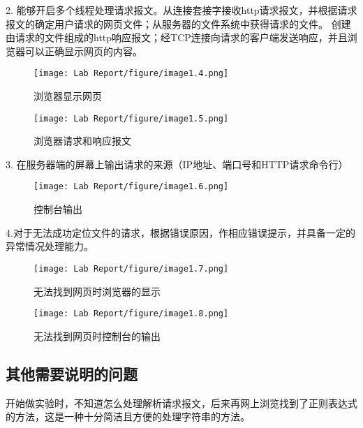 \hspace*{2em}2. 能够开启多个线程处理请求报文。从连接套接字接收http请求报文，并根据请求报文的确定用户请求的网页文件；从服务器的文件系统中获得请求的文件。 创建由请求的文件组成的http响应报文；经TCP连接向请求的客户端发送响应，并且浏览器可以正确显示网页的内容。\\
\begin{figure}[H] %
\centering %
\texttt{[image: Lab Report/figure/image1.4.png]}
\caption{浏览器显示网页} %
\end{figure}
\begin{figure}[H] %
\centering %
\texttt{[image: Lab Report/figure/image1.5.png]}
\caption{浏览器请求和响应报文} %
\end{figure}
\hspace*{2em}3. 在服务器端的屏幕上输出请求的来源（IP地址、端口号和HTTP请求命令行）\\
\begin{figure}[H] %
\centering %
\texttt{[image: Lab Report/figure/image1.6.png]}
\caption{控制台输出} %
\end{figure}
\hspace*{2em}4.对于无法成功定位文件的请求，根据错误原因，作相应错误提示，并具备一定的异常情况处理能力。\\
\begin{figure}[H] %
\centering %
\texttt{[image: Lab Report/figure/image1.7.png]}
\caption{无法找到网页时浏览器的显示} %
\end{figure}
\begin{figure}[H] %
\centering %
\texttt{[image: Lab Report/figure/image1.8.png]}
\caption{无法找到网页时控制台的输出} %
\end{figure}
\subsection{其他需要说明的问题}
\hspace*{2em}开始做实验时，不知道怎么处理解析请求报文，后来再网上浏览找到了正则表达式的方法，这是一种十分简洁且方便的处理字符串的方法。
